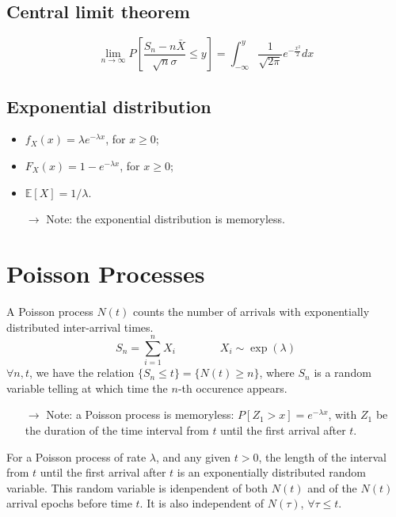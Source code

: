 \documentclass[12pt, openany]{report}
\newcommand{\E}{\mathbb{E}}
\theoremstyle{definition}
\begin{document}
\section{Central limit theorem}
\begin{equation}
  \lim_{n\to \infty} P\left[\frac{S_n-n\bar X}{\sqrt{n}\sigma}\le y\right] = \int_{-\infty}^y \frac{1}{\sqrt{2\pi}} e^{-\frac{x^2}{2}}dx
\end{equation}
\section{Exponential distribution}
\begin{itemize}
  \item $f_X(x)=\lambda e^{-\lambda x}$, for $x\ge 0$;
  \item $F_X(x)=1-e^{-\lambda x}$, for $x\ge 0$;
  \item $\E[X]=1/\lambda$.
  \item [$\rightarrow$] Note: the exponential distribution is memoryless.
\end{itemize}
\chapter{Poisson Processes}
A Poisson process $N(t)$ counts the number of arrivals with exponentially distributed inter-arrival times. 
\begin{equation}
  S_n = \sum_{i=1}^n X_i \qquad \qquad X_i \sim \exp(\lambda)
\end{equation}
$\forall n,t$, we have the relation $\{S_n\le t\}=\{N(t)\ge n\}$, where $S_n$ is a random variable telling at which time the $n$-th occurence appears.\\
\begin{itemize}
  \item [$\rightarrow$] Note: a Poisson process is memoryless: $P[Z_1>x]=e^{-\lambda x}$, with $Z_1$ be the duration of the time interval from $t$ until the first arrival after $t$.
\end{itemize}
For a Poisson process of rate $\lambda$, and any given $t>0$, the length of the interval from $t$ until the first arrival after $t$ is an exponentially distributed random variable. This random variable is idenpendent of both $N(t)$ and of the $N(t)$ arrival epochs before time $t$. It is also independent of $N(\tau)$, $\forall \tau \le t$.\\
\end{document}
